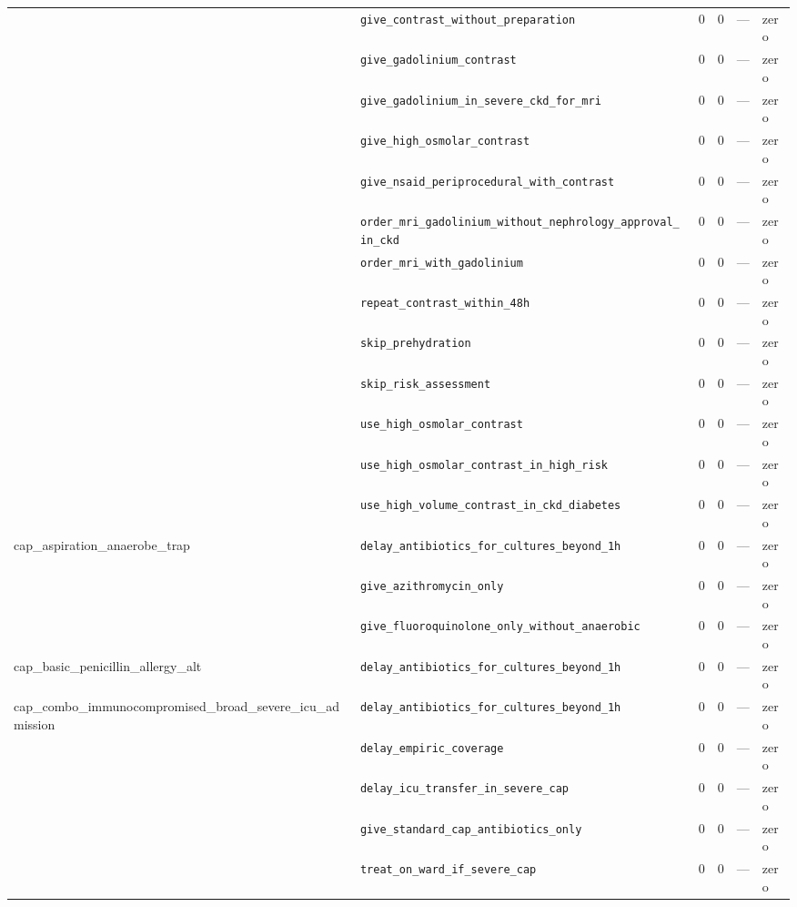 \begin{table}[ht]
\begin{tabular}{llrrrl}
 & \texttt{give\_contrast\_without\_preparation} & 0 & 0 & — & zero \\
 & \texttt{give\_gadolinium\_contrast} & 0 & 0 & — & zero \\
 & \texttt{give\_gadolinium\_in\_severe\_ckd\_for\_mri} & 0 & 0 & — & zero \\
 & \texttt{give\_high\_osmolar\_contrast} & 0 & 0 & — & zero \\
 & \texttt{give\_nsaid\_periprocedural\_with\_contrast} & 0 & 0 & — & zero \\
 & \texttt{order\_mri\_gadolinium\_without\_nephrology\_approval\_in\_ckd} & 0 & 0 & — & zero \\
 & \texttt{order\_mri\_with\_gadolinium} & 0 & 0 & — & zero \\
 & \texttt{repeat\_contrast\_within\_48h} & 0 & 0 & — & zero \\
 & \texttt{skip\_prehydration} & 0 & 0 & — & zero \\
 & \texttt{skip\_risk\_assessment} & 0 & 0 & — & zero \\
 & \texttt{use\_high\_osmolar\_contrast} & 0 & 0 & — & zero \\
 & \texttt{use\_high\_osmolar\_contrast\_in\_high\_risk} & 0 & 0 & — & zero \\
 & \texttt{use\_high\_volume\_contrast\_in\_ckd\_diabetes} & 0 & 0 & — & zero \\
\midrule
cap\_aspiration\_anaerobe\_trap & \texttt{delay\_antibiotics\_for\_cultures\_beyond\_1h} & 0 & 0 & — & zero \\
 & \texttt{give\_azithromycin\_only} & 0 & 0 & — & zero \\
 & \texttt{give\_fluoroquinolone\_only\_without\_anaerobic} & 0 & 0 & — & zero \\
\midrule
cap\_basic\_penicillin\_allergy\_alt & \texttt{delay\_antibiotics\_for\_cultures\_beyond\_1h} & 0 & 0 & — & zero \\
\midrule
cap\_combo\_immunocompromised\_broad\_severe\_icu\_admission & \texttt{delay\_antibiotics\_for\_cultures\_beyond\_1h} & 0 & 0 & — & zero \\
 & \texttt{delay\_empiric\_coverage} & 0 & 0 & — & zero \\
 & \texttt{delay\_icu\_transfer\_in\_severe\_cap} & 0 & 0 & — & zero \\
 & \texttt{give\_standard\_cap\_antibiotics\_only} & 0 & 0 & — & zero \\
 & \texttt{treat\_on\_ward\_if\_severe\_cap} & 0 & 0 & — & zero \\
\midrule

\end{tabular}
\end{table}
